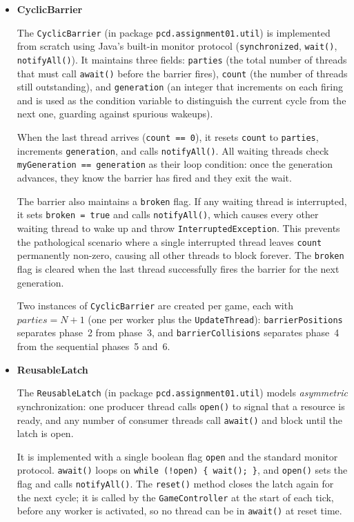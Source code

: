 \documentclass[12pt,a4paper]{article}
\begin{document}
\begin{itemize}
	\item \textbf{CyclicBarrier}
 
The \texttt{CyclicBarrier} (in package \texttt{pcd.assignment01.util}) is
implemented from scratch using Java's built-in monitor protocol
(\texttt{synchronized}, \texttt{wait()}, \texttt{notifyAll()}). It maintains three
fields: \texttt{parties} (the total number of threads that must call \texttt{await()}
before the barrier fires), \texttt{count} (the number of threads still outstanding),
and \texttt{generation} (an integer that increments on each firing and is used as
the condition variable to distinguish the current cycle from the next one, guarding
against spurious wakeups).
 
When the last thread arrives (\texttt{count == 0}), it resets \texttt{count} to
\texttt{parties}, increments \texttt{generation}, and calls \texttt{notifyAll()}.
All waiting threads check \texttt{myGeneration == generation} as their loop
condition: once the generation advances, they know the barrier has fired and they
exit the wait.
 
The barrier also maintains a \texttt{broken} flag. If any waiting thread is
interrupted, it sets \texttt{broken = true} and calls \texttt{notifyAll()}, which
causes every other waiting thread to wake up and throw \texttt{InterruptedException}.
This prevents the pathological scenario where a single interrupted thread leaves
\texttt{count} permanently non-zero, causing all other threads to block forever.
The \texttt{broken} flag is cleared when the last thread successfully fires the
barrier for the next generation.
 
Two instances of \texttt{CyclicBarrier} are created per game, each with
$\mathit{parties} = N + 1$ (one per worker plus the \texttt{UpdateThread}):
\texttt{barrierPositions} separates phase~2 from phase~3, and
\texttt{barrierCollisions} separates phase~4 from the sequential phases~5 and~6.
 
\item \textbf{ReusableLatch}
 
The \texttt{ReusableLatch} (in package \texttt{pcd.assignment01.util}) models
\emph{asymmetric} synchronization: one producer thread calls \texttt{open()} to
signal that a resource is ready, and any number of consumer threads call
\texttt{await()} and block until the latch is open.
 
It is implemented with a single boolean flag \texttt{open} and the standard
monitor protocol. \texttt{await()} loops on \texttt{while (!open) \{ wait(); \}},
and \texttt{open()} sets the flag and calls \texttt{notifyAll()}. The
\texttt{reset()} method closes the latch again for the next cycle; it is called
by the \texttt{GameController} at the start of each tick, before any worker is
activated, so no thread can be in \texttt{await()} at reset time.
 

\end{itemize}
\end{document}
